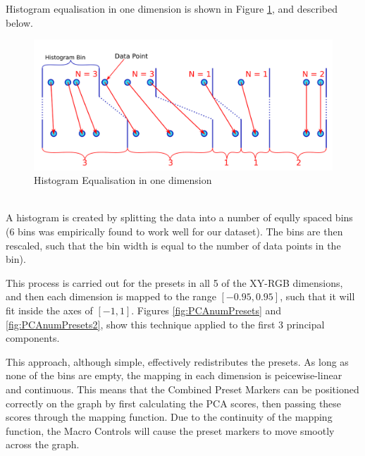 \documentclass[11pt, oneside]{report}   	%
\begin{document}
Histogram equalisation in one dimension is shown in Figure \ref{fig:HistEq}, and described below.
\begin{figure}[h] 
	\vspace{-20pt}
	\centering
	\includegraphics[trim={0, 5pt, 0, 5pt}, clip, width = 6in]{HistogramEquilisation.png}
	\caption{Histogram Equalisation in one dimension}
	\label{fig:HistEq}
\end{figure}\\
A histogram is created by splitting the data into a number of eqully spaced bins (6 bins was empirically found to work well for our dataset). The bins are then rescaled, such that the bin width is equal to the number of data points in the bin).

This process is carried out for the presets in all 5 of the XY-RGB dimensions, and then each dimension is mapped to the range $[-0.95, 0.95]$, such that it will fit inside the axes of $[-1, 1]$. Figures \ref{fig:PCAnumPresets} and \ref{fig:PCAnumPresets2}, show this technique applied to the first 3 principal components.

This approach, although simple, effectively redistributes the presets. As long as none of the bins are empty, the mapping in each dimension is peicewise-linear and continuous. This means that the Combined Preset Markers can be positioned correctly on the graph by first calculating the PCA scores, then passing these scores through the mapping function. Due to the continuity of the mapping function, the Macro Controls will cause the preset markers to move smootly across the graph.
\end{document}
